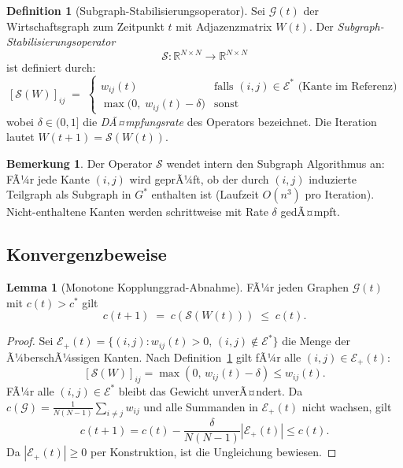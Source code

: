 ﻿\documentclass[a4paper,12pt]{article}
\theoremstyle{definition}
\newtheorem{definition}{Definition}
\newtheorem{lemma}{Lemma}
\newtheorem{bemerkung}{Bemerkung}
\begin{document}
\begin{definition}[Subgraph-Stabilisierungsoperator]
\label{def:stabop}
    Sei $\mathcal{G}(t)$ der Wirtschaftsgraph zum Zeitpunkt $t$ mit Adjazenzmatrix $W(t)$.
    Der \emph{Subgraph-Stabilisierungsoperator}
    \[
        \mathcal{S} : \mathbb{R}^{N \times N} \to \mathbb{R}^{N \times N}
    \]
    ist definiert durch:
    \[
        [\mathcal{S}(W)]_{ij} \;=\;
        \begin{cases}
            w_{ij}(t) & \text{falls } (i,j) \in \mathcal{E}^* \text{ (Kante im Referenz)} \\
            \max\!\bigl(0,\; w_{ij}(t) - \delta\bigr) & \text{sonst}
        \end{cases}
    \]
    wobei $\delta \in (0,1]$ die \emph{DÃ¤mpfungsrate} des Operators bezeichnet.
    Die Iteration lautet $W(t+1) = \mathcal{S}(W(t))$.
\end{definition}

\begin{bemerkung}
    Der Operator $\mathcal{S}$ wendet intern den Subgraph Algorithmus an: FÃ¼r jede
    Kante $(i,j)$ wird geprÃ¼ft, ob der durch $(i,j)$ induzierte Teilgraph
    als Subgraph in $G^*$ enthalten ist (Laufzeit $O(n^3)$ pro Iteration).
    Nicht-enthaltene Kanten werden schrittweise mit Rate $\delta$ gedÃ¤mpft.
\end{bemerkung}

\subsection{Konvergenzbeweise}

\begin{lemma}[Monotone Kopplung\-grad-Abnahme]
\label{lem:mono_c}
    FÃ¼r jeden Graphen $\mathcal{G}(t)$ mit $c(t) > c^*$ gilt
    \[
        c(t+1) \;=\; c(\mathcal{S}(W(t))) \;\leq\; c(t).
    \]
\end{lemma}

\begin{proof}
    Sei $\mathcal{E}_+(t) = \{(i,j) : w_{ij}(t) > 0,\, (i,j) \notin \mathcal{E}^*\}$
    die Menge der Ã¼berschÃ¼ssigen Kanten. Nach Definition~\ref{def:stabop} gilt fÃ¼r
    alle $(i,j) \in \mathcal{E}_+(t)$:
    \[
        [\mathcal{S}(W)]_{ij} = \max(0,\, w_{ij}(t) - \delta) \leq w_{ij}(t).
    \]
    FÃ¼r alle $(i,j) \in \mathcal{E}^*$ bleibt das Gewicht unverÃ¤ndert. Da
    $c(\mathcal{G}) = \frac{1}{N(N-1)}\sum_{i \neq j} w_{ij}$ und alle
    Summanden in $\mathcal{E}_+(t)$ nicht wachsen, gilt
    \[
        c(t+1) = c(t) - \frac{\delta}{N(N-1)} |\mathcal{E}_+(t)| \leq c(t).
    \]
    Da $|\mathcal{E}_+(t)| \geq 0$ per Konstruktion, ist die Ungleichung bewiesen.
\end{proof}
\end{document}
